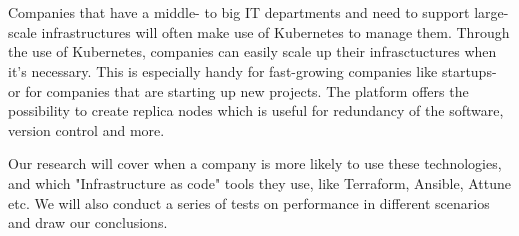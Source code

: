 \chapter*{}
Companies that have a middle- to big IT departments and need to support large-scale infrastructures will often make use
of Kubernetes to manage them. Through the use of Kubernetes, companies can easily scale up their infrasctuctures when it's necessary.
This is especially handy for fast-growing companies like startups- or for companies that are starting up new projects.
The platform offers the possibility to create replica nodes which is useful for redundancy of the software, version control and more.

Our research will cover when a company is more likely to use these technologies, and which "Infrastructure as code" tools they use, like Terraform, Ansible, Attune etc.
We will also conduct a series of tests on performance in different scenarios and draw our conclusions.

